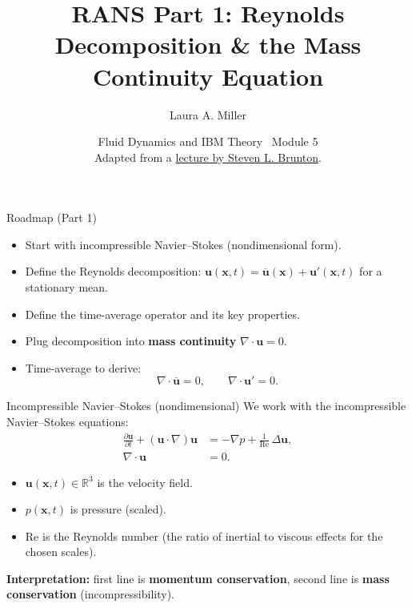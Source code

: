 \documentclass[aspectratio=169,11pt]{beamer}
\title[RANS I: Continuity]{RANS Part 1: Reynolds Decomposition \& the Mass Continuity Equation}
\author[Miller]{Laura A. Miller}
\institute[UArizona]{Department of Mathematics, University of Arizona}
\date{Fluid Dynamics and IBM Theory \textbullet\ Module 5\\[3pt]
  Adapted from a \href{https://www.youtube.com/watch?v=mDt-HJEXK6g}{lecture by Steven L. Brunton}.}
\newcommand{\uu}{\bm{u}}
\newcommand{\x}{\bm{x}}
\newcommand{\pp}{p}
\newcommand{\Rey}{\mathrm{Re}}
\newcommand{\avg}[1]{\overline{#1}}
\renewcommand{\up}{\uu'} %
\newcommand{\ubar}{\avg{\uu}}
\begin{document}
\begin{frame}[plain]
\maketutorialtitle
\end{frame}

\begin{frame}{Roadmap (Part 1)}
\begin{itemize}
  \item Start with incompressible Navier--Stokes (nondimensional form).
  \item Define the Reynolds decomposition: $\uu(\x,t)=\ubar(\x)+\up(\x,t)$ for a stationary mean.
  \item Define the time-average operator and its key properties.
  \item Plug decomposition into \textbf{mass continuity} $\nabla\cdot\uu=0$.
  \item Time-average to derive:
  \[
    \nabla\cdot\ubar = 0,
    \qquad
    \nabla\cdot\up = 0.
  \]
\end{itemize}
\end{frame}

\begin{frame}{Incompressible Navier--Stokes (nondimensional)}
We work with the incompressible Navier--Stokes equations:
\begin{align*}
\frac{\partial \uu}{\partial t} + (\uu\cdot\nabla)\uu &= -\nabla \pp + \frac{1}{\Rey}\,\Delta \uu,\\
\nabla\cdot\uu &= 0.
\end{align*}

\begin{itemize}
  \item $\uu(\x,t)\in\mathbb{R}^3$ is the velocity field.
  \item $\pp(\x,t)$ is pressure (scaled).
  \item $\Rey$ is the Reynolds number (the ratio of inertial to viscous effects for the chosen scales).
\end{itemize}

\textbf{Interpretation:} first line is  \textbf{momentum conservation}, second line is \textbf{mass conservation} (incompressibility).
\end{frame}
\end{document}

